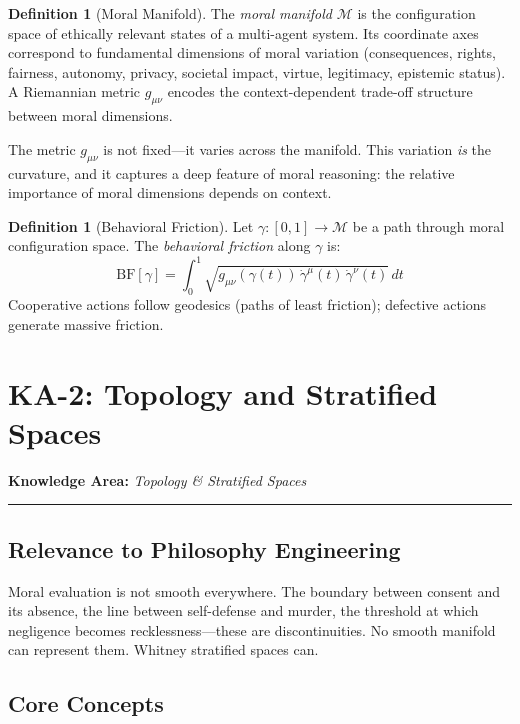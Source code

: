 \documentclass[12pt,letterpaper]{article}
\theoremstyle{definition}
\newtheorem{definition}[theorem]{Definition}
\theoremstyle{plain}
\newcommand{\calM}{\mathcal{M}}
\newcommand{\BF}{\mathrm{BF}}
\newcommand{\ka}[1]{\vspace{1em}\noindent\textbf{\large Knowledge Area:} \textit{#1}\vspace{0.5em}\hrule\vspace{0.5em}}
\begin{document}
\begin{definition}[Moral Manifold]
\label{def:moral-manifold}
The \emph{moral manifold} $\calM$ is the configuration space of ethically relevant states of a multi-agent system. Its coordinate axes correspond to fundamental dimensions of moral variation (consequences, rights, fairness, autonomy, privacy, societal impact, virtue, legitimacy, epistemic status). A Riemannian metric $g_{\mu\nu}$ encodes the context-dependent trade-off structure between moral dimensions.
\end{definition}

The metric $g_{\mu\nu}$ is not fixed---it varies across the manifold. This variation \emph{is} the curvature, and it captures a deep feature of moral reasoning: the relative importance of moral dimensions depends on context.

\begin{definition}[Behavioral Friction]
\label{def:friction}
Let $\gamma: [0,1] \to \calM$ be a path through moral configuration space. The \emph{behavioral friction} along $\gamma$ is:
\begin{equation}
\BF[\gamma] = \int_0^1 \sqrt{g_{\mu\nu}(\gamma(t))\, \dot{\gamma}^\mu(t)\, \dot{\gamma}^\nu(t)}\, dt
\end{equation}
Cooperative actions follow geodesics (paths of least friction); defective actions generate massive friction.
\end{definition}


\section{KA-2: Topology and Stratified Spaces}
\label{sec:ka2}

\ka{Topology \& Stratified Spaces}

\subsection{Relevance to Philosophy Engineering}

Moral evaluation is not smooth everywhere. The boundary between consent and its absence, the line between self-defense and murder, the threshold at which negligence becomes recklessness---these are discontinuities. No smooth manifold can represent them. Whitney stratified spaces can.

\subsection{Core Concepts}
\end{document}
